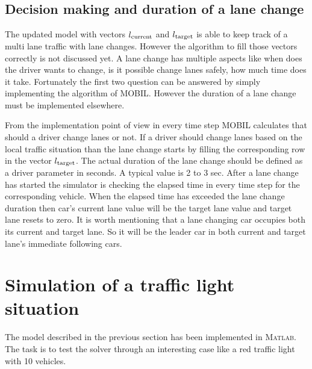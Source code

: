 		\subsection*{Decision making and duration of a lane change}
		The updated model with vectors $l_{\rm current}$ and $l_{\rm target}$ is able to keep track of a multi lane traffic with lane changes. However the algorithm to fill those vectors correctly is not discussed yet. A lane change has multiple aspects like when does the driver wants to change, is it possible change lanes safely, how much time does it take. Fortunately the first two question can be answered by simply implementing the algorithm of MOBIL. However the duration of a lane change must be implemented elsewhere.

		From the implementation point of view in every time step MOBIL calculates that should a driver change lanes or not. If a driver should change lanes based on the local traffic situation than the lane change starts by filling the corresponding row in the vector $l_{\rm target}$. The actual duration of the lane change should be defined as a driver parameter in seconds. A typical value is 2 to 3 sec. After a lane change has started the simulator is checking the elapsed time in every time step for the corresponding vehicle. When the elapsed time has exceeded the lane change duration then car's current lane value will be the target lane value and target lane resets to zero. It is worth mentioning that a lane changing car occupies both its current and target lane. So it will be the leader car in both current and target lane's immediate following cars.
	\section{Simulation of a traffic light situation}
		The model described in the previous section has been implemented in \textsc{Matlab}. The task is to test the solver through an interesting case like a red traffic light with 10 vehicles.
